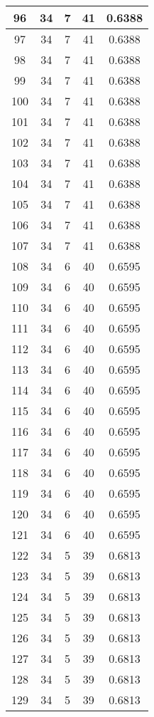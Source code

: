 \documentclass[letterpaper, 12pt]{article}
\begin{document}
\begin{longtable}{|c|c|c|c|c|}
\hline
96 & 34 & 7 & 41 & 0.6388 \\
\hline
97 & 34 & 7 & 41 & 0.6388 \\
\hline
98 & 34 & 7 & 41 & 0.6388 \\
\hline
99 & 34 & 7 & 41 & 0.6388 \\
\hline
100 & 34 & 7 & 41 & 0.6388 \\
\hline
101 & 34 & 7 & 41 & 0.6388 \\
\hline
102 & 34 & 7 & 41 & 0.6388 \\
\hline
103 & 34 & 7 & 41 & 0.6388 \\
\hline
104 & 34 & 7 & 41 & 0.6388 \\
\hline
105 & 34 & 7 & 41 & 0.6388 \\
\hline
106 & 34 & 7 & 41 & 0.6388 \\
\hline
107 & 34 & 7 & 41 & 0.6388 \\
\hline
108 & 34 & 6 & 40 & 0.6595 \\
\hline
109 & 34 & 6 & 40 & 0.6595 \\
\hline
110 & 34 & 6 & 40 & 0.6595 \\
\hline
111 & 34 & 6 & 40 & 0.6595 \\
\hline
112 & 34 & 6 & 40 & 0.6595 \\
\hline
113 & 34 & 6 & 40 & 0.6595 \\
\hline
114 & 34 & 6 & 40 & 0.6595 \\
\hline
115 & 34 & 6 & 40 & 0.6595 \\
\hline
116 & 34 & 6 & 40 & 0.6595 \\
\hline
117 & 34 & 6 & 40 & 0.6595 \\
\hline
118 & 34 & 6 & 40 & 0.6595 \\
\hline
119 & 34 & 6 & 40 & 0.6595 \\
\hline
120 & 34 & 6 & 40 & 0.6595 \\
\hline
121 & 34 & 6 & 40 & 0.6595 \\
\hline
122 & 34 & 5 & 39 & 0.6813 \\
\hline
123 & 34 & 5 & 39 & 0.6813 \\
\hline
124 & 34 & 5 & 39 & 0.6813 \\
\hline
125 & 34 & 5 & 39 & 0.6813 \\
\hline
126 & 34 & 5 & 39 & 0.6813 \\
\hline
127 & 34 & 5 & 39 & 0.6813 \\
\hline
128 & 34 & 5 & 39 & 0.6813 \\
\hline
129 & 34 & 5 & 39 & 0.6813 \\

\end{longtable}
\end{document}
